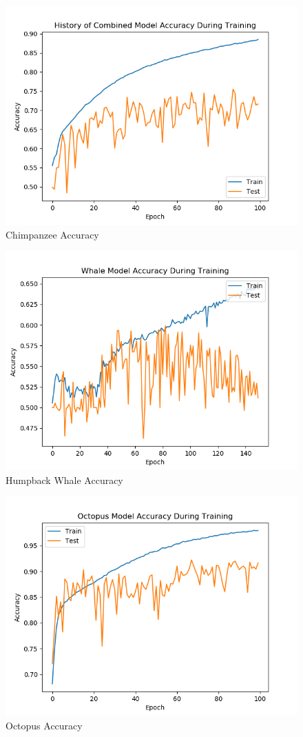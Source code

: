 \documentclass[11pt]{article}
\begin{document}
\begin{figure}
    \includegraphics[width=17cm]{ChimpAcc.png}
  \caption{Chimpanzee Accuracy}
\end{figure}

\begin{figure}
    \includegraphics[width=17cm]{HumpbackWhaleAccuracy.png}
  \caption{Humpback Whale Accuracy}
\end{figure}

\begin{figure}
    \includegraphics[width=17cm]{OctopusAccuracy.png}
  \caption{Octopus Accuracy}
\end{figure}



\clearpage


\end{document}
